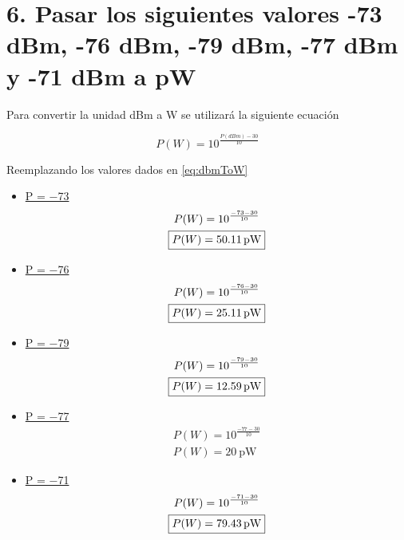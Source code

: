 \documentclass[11pt,a4paper]{article}
\begin{document}
\section*{6. Pasar los siguientes valores -73 dBm, -76 dBm, -79 dBm, -77 dBm y -71 dBm a
pW}

Para convertir la unidad dBm a W se utilizará la siguiente ecuación

\begin{equation}
    P(W) = 10^{\frac{P(dBm) - 30}{10}}
    \label{eq:dbmToW}
\end{equation}

Reemplazando los valores dados en \eqref{eq:dbmToW}

\begin{itemize}
    \item \underline{P = \SI{-73}{\dBm}}
        \[
            \begin{gathered}
                P(W) = 10^{\frac{-73 - 30}{10}} \\
                \boxed{P(W) = \SI{50{,}11}{\pico\watt}}
            \end{gathered}
        \]
    \item \underline{P = \SI{-76}{\dBm}}
        \[
            \begin{gathered}
                P(W) = 10^{\frac{-76 - 30}{10}} \\
                \boxed{P(W) = \SI{25{,}11}{\pico\watt}}
            \end{gathered}
        \]
    \item \underline{P = \SI{-79}{\dBm}}
        \[
            \begin{gathered}
                P(W) = 10^{\frac{-79 - 30}{10}} \\
                \boxed{P(W) = \SI{12{,}59}{\pico\watt}}
            \end{gathered}
        \]
    \item \underline{P = \SI{-77}{\dBm}}
        \[
            \begin{gathered}
                P(W) = 10^{\frac{-77 - 30}{10}} \\
                \boxed{P(W) = \SI{20}{\pico\watt}}
            \end{gathered}
        \]
        \newpage
    \item \underline{P = \SI{-71}{\dBm}}
        \[
            \begin{gathered}
                P(W) = 10^{\frac{-71 - 30}{10}} \\
                \boxed{P(W) = \SI{79{,}43}{\pico\watt}}
            \end{gathered}
        \]
\end{itemize}
\end{document}
